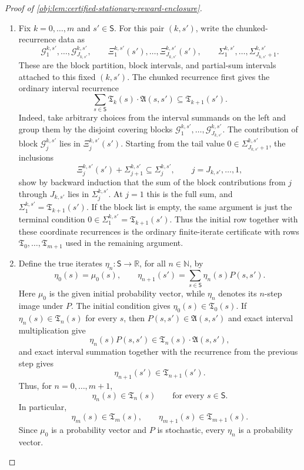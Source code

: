 \begin{proof}[Proof of \cref{obj:lem:certified-stationary-reward-enclosure}]
\begin{enumerate}
\item Fix \(k=0,\ldots,m\) and \(s'\in\mathsf S\).  For this pair \((k,s')\), write the chunked-recurrence data as
\[
\mathcal G^{k,s'}_1,\ldots,\mathcal G^{k,s'}_{J_{k,s'}},
\qquad
\Xi^{k,s'}_1(s'),\ldots,\Xi^{k,s'}_{J_{k,s'}}(s'),
\qquad
\Sigma^{k,s'}_1,\ldots,\Sigma^{k,s'}_{J_{k,s'}+1}.
\]
These are the block partition, block intervals, and partial-sum intervals attached to this fixed \((k,s')\).  The chunked recurrence first gives the ordinary interval recurrence
\[
\sum_{s\in\mathsf S}\mathfrak T_k(s)\cdot\mathfrak A(s,s')
   \subseteq \mathfrak T_{k+1}(s').
\]
Indeed, take arbitrary choices from the interval summands on the left and group them by the disjoint covering blocks \(\mathcal G^{k,s'}_1,\ldots,\mathcal G^{k,s'}_{J_{k,s'}}\).  The contribution of block \(\mathcal G^{k,s'}_j\) lies in \(\Xi^{k,s'}_j(s')\).  Starting from the tail value \(0\in\Sigma^{k,s'}_{J_{k,s'}+1}\), the inclusions
\[
\Xi^{k,s'}_j(s')+\Sigma^{k,s'}_{j+1}\subseteq \Sigma^{k,s'}_j,
\qquad j=J_{k,s'},\ldots,1,
\]
show by backward induction that the sum of the block contributions from \(j\) through \(J_{k,s'}\) lies in \(\Sigma^{k,s'}_j\).  At \(j=1\) this is the full sum, and \(\Sigma^{k,s'}_1=\mathfrak T_{k+1}(s')\).  If the block list is empty, the same argument is just the terminal condition \(0\in\Sigma^{k,s'}_1=\mathfrak T_{k+1}(s')\).  Thus the initial row together with these coordinate recurrences is the ordinary finite-iterate certificate with rows \(\mathfrak T_0,\ldots,\mathfrak T_{m+1}\) used in the remaining argument. %

\item Define the true iterates \(\eta_n:\mathsf S\to\mathbb R\), for all \(n\in\mathbb N\), by
\[
\eta_{0}(s)=\mu_0(s),\qquad
\eta_{n+1}(s')=\sum_{s\in\mathsf S}\eta_n(s)P(s,s').
\]
Here \(\mu_0\) is the given initial probability vector, while \(\eta_n\) denotes its \(n\)-step image under \(P\).  The initial condition gives \(\eta_0(s)\in\mathfrak T_0(s)\).  If \(\eta_n(s)\in\mathfrak T_n(s)\) for every \(s\), then \(P(s,s')\in\mathfrak A(s,s')\) and exact interval multiplication give
\[
\eta_n(s)P(s,s')\in \mathfrak T_n(s)\cdot\mathfrak A(s,s'),
\]
and exact interval summation together with the recurrence from the previous step gives
\[
\eta_{n+1}(s')\in\mathfrak T_{n+1}(s').
\]
Thus, for \(n=0,\ldots,m+1\),
\[
\eta_n(s)\in\mathfrak T_n(s)\qquad\text{for every }s\in\mathsf S.
\]
In particular,
\[
\eta_m(s)\in\mathfrak T_m(s),\qquad
\eta_{m+1}(s)\in\mathfrak T_{m+1}(s).
\]
Since \(\mu_0\) is a probability vector and \(P\) is stochastic, every \(\eta_n\) is a probability vector. %


\end{enumerate}
\end{proof}
